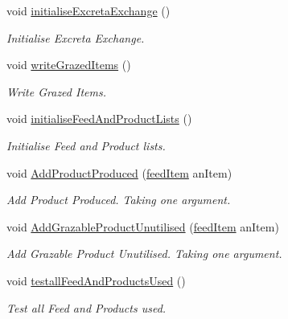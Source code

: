 \begin{DoxyCompactItemize}
void \mbox{\hyperlink{class_global_vars_ac5574c4c8e6b42592e74966bd08e5b9f}{initialise\+Excreta\+Exchange}} ()
\begin{DoxyCompactList}\small\item\em Initialise Excreta Exchange. \end{DoxyCompactList}\item 
void \mbox{\hyperlink{class_global_vars_a98c292c18939cf158a65aa68f9abdb07}{write\+Grazed\+Items}} ()
\begin{DoxyCompactList}\small\item\em Write Grazed Items. \end{DoxyCompactList}\item 
\mbox{\label{class_global_vars_af10abdb4f5f605edc5d550ec70e38b56}} 
void \mbox{\hyperlink{class_global_vars_af10abdb4f5f605edc5d550ec70e38b56}{initialise\+Feed\+And\+Product\+Lists}} ()
\begin{DoxyCompactList}\small\item\em Initialise Feed and Product lists. \end{DoxyCompactList}\item 
void \mbox{\hyperlink{class_global_vars_ab82efa871de33736324f919209f89c46}{Add\+Product\+Produced}} (\mbox{\hyperlink{classfeed_item}{feed\+Item}} an\+Item)
\begin{DoxyCompactList}\small\item\em Add Product Produced. Taking one argument. \end{DoxyCompactList}\item 
void \mbox{\hyperlink{class_global_vars_ab89dab6808de1b3cf7dea479146f6865}{Add\+Grazable\+Product\+Unutilised}} (\mbox{\hyperlink{classfeed_item}{feed\+Item}} an\+Item)
\begin{DoxyCompactList}\small\item\em Add Grazable Product Unutilised. Taking one argument. \end{DoxyCompactList}\item 
void \mbox{\hyperlink{class_global_vars_af6defb06d764d2316cbb4e964265a4b9}{testall\+Feed\+And\+Products\+Used}} ()
\begin{DoxyCompactList}\small\item\em Test all Feed and Products used. \end{DoxyCompactList}\item 
\mbox{\label{class_global_vars_a8829945aaadcc14efa19328c512c3a43}} 

\end{DoxyCompactItemize}
